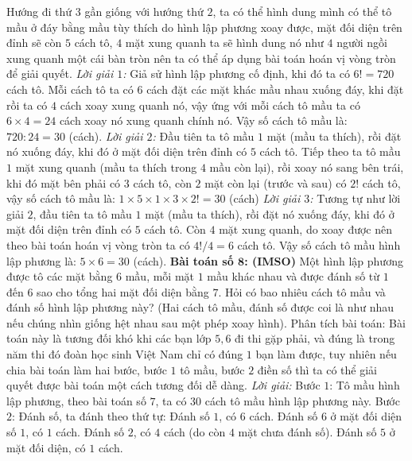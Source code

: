 \begin{multicols}{2}
	\vskip 0.1cm
	Hướng đi thứ $3$ gần giống với hướng thứ $2$, ta có thể hình dung mình có thể tô mầu ở đáy bằng mầu tùy thích do hình lập phương xoay được, mặt đối diện trên đỉnh sẽ còn $5$ cách tô, $4$ mặt xung quanh ta sẽ hình dung nó như $4$ người ngồi xung quanh một cái bàn tròn nên ta có thể áp dụng bài toán hoán vị vòng tròn để giải quyết.
	\vskip 0.1cm
	\textit{Lời giải $1$:}
	Giả sử hình lập phương cố định, khi đó ta có $6!=720$ cách tô.
	\vskip 0.1cm
	Mỗi cách tô ta có $6$ cách đặt các mặt khác mầu nhau xuống đáy, khi đặt rồi ta có $4$ cách xoay xung quanh nó, vậy ứng với mỗi cách tô mầu ta có $6\times4=24$ cách xoay nó xung quanh chính nó. Vậy số cách tô mầu là: $720:24=30$ (cách).
	\vskip 0.1cm
	\textit{Lời giải $2$:}
	Đầu tiên ta tô mầu $1$ mặt (mầu ta thích), rồi đặt nó xuống đáy, khi đó ở mặt đối diện trên đỉnh có $5$ cách tô.
	\vskip 0.1cm
	Tiếp theo ta tô mầu $1$ mặt xung quanh (mầu ta thích trong $4$ mầu còn lại), rồi xoay nó sang bên trái, khi đó mặt bên phải có $3$ cách tô, còn $2$ mặt còn lại (trước và sau) có $2!$ cách tô, vậy số cách tô mầu là: $1\times5\times1\times3\times2!=30$ (cách)
	\vskip 0.1cm
	\textit{Lời giải $3$:}
	Tương tự như lời giải $2$, đầu tiên ta tô mầu $1$ mặt (mầu ta thích), rồi đặt nó xuống đáy, khi đó ở mặt đối diện trên đỉnh có $5$ cách tô.
	\vskip 0.1cm
	Còn $4$ mặt xung quanh, do xoay được nên theo bài toán hoán vị vòng tròn ta có $4!/4=6$ cách tô.
	\vskip 0.1cm
	Vậy số cách tô mầu hình lập phương là: $5\times 6=30$ (cách).
	\vskip 0.1cm
	\textbf{\color{toancuabi}Bài toán số $\pmb{8}$: (IMSO)}
	\vskip 0.1cm
	Một hình lập phương được tô các mặt bằng $6$ mầu, mỗi mặt $1$ mầu khác nhau và được đánh số từ $1$ đến $6$ sao cho tổng hai mặt đối diện bằng $7$. Hỏi có bao nhiêu cách tô mầu và đánh số hình lập phương này? (Hai cách tô mầu, đánh số được coi là như nhau nếu chúng nhìn giống hệt nhau sau một phép xoay hình). 
	\vskip 0.1cm
	Phân tích bài toán: Bài toán này là tương đối khó khi các bạn lớp $5,6$ đi thi gặp phải, và đúng là trong năm thi đó đoàn học sinh Việt Nam chỉ có đúng $1$ bạn làm được, tuy nhiên nếu chia bài toán làm hai bước, bước $1$ tô mầu, bước $2$ điền số thì ta có thể giải quyết được bài toán một cách tương đối dễ dàng.
	\vskip 0.1cm
	\textit{Lời giải:}
	Bước $1$: Tô mầu hình lập phương, theo bài toán số $7$, ta có $30$ cách tô mầu hình lập phương này.
	\vskip 0.1cm
	Bước $2$: Đánh số, ta đánh theo thứ tự:
	\vskip 0.1cm
	Đánh số $1$, có $6$ cách. Đánh số $6$ ở mặt đối diện số $1$, có $1$ cách.
	\vskip 0.1cm
	Đánh số $2$, có $4$ cách (do còn $4$ mặt chưa đánh số). Đánh số $5$ ở mặt đối diện, có $1$ cách.

\end{multicols}
